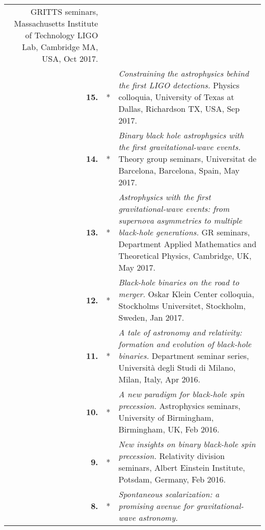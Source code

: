\documentclass[letterpaper]{moderncv}
\begin{document}
{\begin{longtable}{rp{0.4cm}p{15.8cm}}
\newline{} 
GRITTS seminars, Massachusetts Institute of Technology LIGO Lab, Cambridge MA, USA, Oct 2017.
\vspace{0.05cm}\\
%
\textbf{15.} & *& \textit{Constraining the astrophysics behind the first LIGO detections.}
\newline{} 
Physics colloquia, University of Texas at Dallas, Richardson TX, USA, Sep 2017.
\vspace{0.05cm}\\
%
\textbf{14.} & *& \textit{Binary black hole astrophysics with the first gravitational-wave events.}
\newline{} 
Theory group seminars, Universitat de Barcelona, Barcelona, Spain, May 2017.
\vspace{0.05cm}\\
%
\textbf{13.} & *& \textit{Astrophysics with the first gravitational-wave events: from supernova asymmetries to multiple black-hole generations.}
\newline{} 
GR seminars, Department Applied Mathematics and Theoretical Physics, Cambridge, UK, May 2017.
\vspace{0.05cm}\\
%
\textbf{12.} & *& \textit{Black-hole binaries on the road to merger.}
\newline{} 
Oskar Klein Center colloquia, Stockholms Universitet, Stockholm, Sweden, Jan 2017.
\vspace{0.05cm}\\
%
\textbf{11.} & *& \textit{A tale of astronomy and relativity: formation and evolution of black-hole binaries.}
\newline{} 
Department seminar series, Università degli Studi di Milano, Milan, Italy, Apr 2016.
\vspace{0.05cm}\\
%
\textbf{10.} & *& \textit{A new paradigm for black-hole spin precession.}
\newline{} 
Astrophysics seminars, University of Birmingham, Birmingham, UK, Feb 2016.
\vspace{0.05cm}\\
%
\textbf{9.} & *& \textit{New insights on binary black-hole spin precession.}
\newline{} 
Relativity division seminars, Albert Einstein Institute, Potsdam, Germany, Feb 2016.
\vspace{0.05cm}\\
%
\textbf{8.} & *& \textit{Spontaneous scalarization: a promising avenue for gravitational-wave astronomy.}

\end{longtable}}
\end{document}
